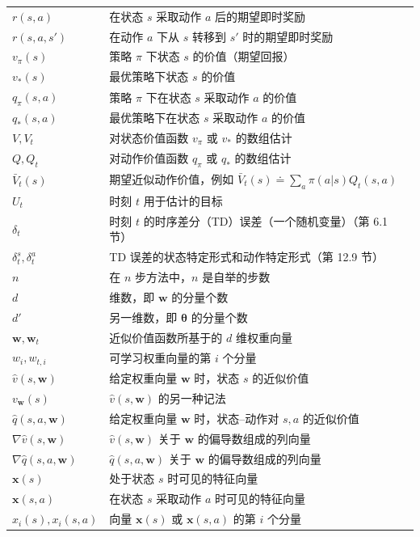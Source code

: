 \documentclass[UTF8, 12pt, fontset=fandol, oneside]{ctexart}
\begin{document}
\begin{longtable}{p{}p{}}
$r(s,a)$ & 在状态 $s$ 采取动作 $a$ 后的期望即时奖励 \\
$r(s,a,s')$ & 在动作 $a$ 下从 $s$ 转移到 $s'$ 时的期望即时奖励 \\
$v_\pi(s)$ & 策略 $\pi$ 下状态 $s$ 的价值（期望回报） \\
$v_*(s)$ & 最优策略下状态 $s$ 的价值 \\
$q_\pi(s,a)$ & 策略 $\pi$ 下在状态 $s$ 采取动作 $a$ 的价值 \\
$q_*(s,a)$ & 最优策略下在状态 $s$ 采取动作 $a$ 的价值 \\
$V,V_t$ & 对状态价值函数 $v_\pi$ 或 $v_*$ 的数组估计 \\
$Q,Q_t$ & 对动作价值函数 $q_\pi$ 或 $q_*$ 的数组估计 \\
$\bar V_t(s)$ & 期望近似动作价值，例如 $\bar V_t(s)\doteq\sum_a\pi(a|s)Q_t(s,a)$ \\
$U_t$ & 时刻 $t$ 用于估计的目标 \\
$\delta_t$ & 时刻 $t$ 的时序差分（TD）误差（一个随机变量）（第 6.1 节） \\
$\delta_t^s,\delta_t^a$ & TD 误差的状态特定形式和动作特定形式（第 12.9 节） \\
$n$ & 在 $n$ 步方法中，$n$ 是自举的步数 \\
$d$ & 维数，即 $\mathbf{w}$ 的分量个数 \\
$d'$ & 另一维数，即 $\boldsymbol{\theta}$ 的分量个数 \\
$\mathbf{w},\mathbf{w}_t$ & 近似价值函数所基于的 $d$ 维权重向量 \\
$w_i,w_{t,i}$ & 可学习权重向量的第 $i$ 个分量 \\
$\hat v(s,\mathbf{w})$ & 给定权重向量 $\mathbf{w}$ 时，状态 $s$ 的近似价值 \\
$v_{\mathbf{w}}(s)$ & $\hat v(s,\mathbf{w})$ 的另一种记法 \\
$\hat q(s,a,\mathbf{w})$ & 给定权重向量 $\mathbf{w}$ 时，状态--动作对 $s,a$ 的近似价值 \\
$\nabla\hat v(s,\mathbf{w})$ & $\hat v(s,\mathbf{w})$ 关于 $\mathbf{w}$ 的偏导数组成的列向量 \\
$\nabla\hat q(s,a,\mathbf{w})$ & $\hat q(s,a,\mathbf{w})$ 关于 $\mathbf{w}$ 的偏导数组成的列向量 \\
$\mathbf{x}(s)$ & 处于状态 $s$ 时可见的特征向量 \\
$\mathbf{x}(s,a)$ & 在状态 $s$ 采取动作 $a$ 时可见的特征向量 \\
$x_i(s),x_i(s,a)$ & 向量 $\mathbf{x}(s)$ 或 $\mathbf{x}(s,a)$ 的第 $i$ 个分量 \\

\end{longtable}
\end{document}

